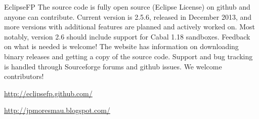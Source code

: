 \begin{hcarentry}[updated]{EclipseFP}
The source code is fully open source (Eclipse License) on github and anyone can contribute. Current version is 2.5.6, released in December 2013, and more versions with additional features are planned and actively worked on. Most notably, version 2.6 should include support for Cabal 1.18 sandboxes. Feedback on what is needed is welcome! The website has information on downloading binary releases and getting a copy of the source code. Support and bug tracking is handled through Sourceforge forums and github issues. We welcome contributors!

\FurtherReading
\begin{compactitem}
\item \url{http://eclipsefp.github.com/}
\item \url{http://jpmoresmau.blogspot.com/}
\end{compactitem}
\end{hcarentry}

